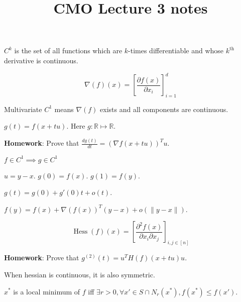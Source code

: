 

\title{CMO Lecture 3 notes}



\maketitle
\initMinimal{}

$C^k$ is the set of all functions which are $k$-times differentiable
and whose $k^{\textrm{th}}$ derivative is continuous.

\[ \nabla(f)(x) = \left[ \frac{\partial f(x)}{\partial x_i} \right]_{i=1}^d \]

Multivariate $C^1$ means $\nabla(f)$ exists and all components are continuous.

$g(t) = f(x + tu)$. Here $g: \mathbb{R} \mapsto \mathbb{R}$.

\textbf{Homework}: Prove that $\frac{dg(t)}{dt} = (\nabla f(x+tu))^Tu$.

\begin{theorem} $f \in C^1 \implies g \in C^1$ \end{theorem}

$u = y - x$. $g(0) = f(x)$. $g(1) = f(y)$.

$g(t) = g(0) + g'(0)t + o(t)$.

$f(y) = f(x) + \nabla(f(x))^T(y-x) + o(\|y-x\|)$.

\[ \operatorname{Hess}(f)(x) = \left[ \frac{\partial^2 f(x)}{\partial x_i \partial x_j} \right]_{i, j \in [n]} \]

\textbf{Homework}: Prove that $g^{(2)}(t) = u^T H(f)(x+tu) u$.

When hessian is continuous, it is also symmetric.

$x^*$ is a local minimum of $f$ iff
$\exists r > 0, \forall x' \in S \cap N_r(x^*), f(x^*) \le f(x')$.


